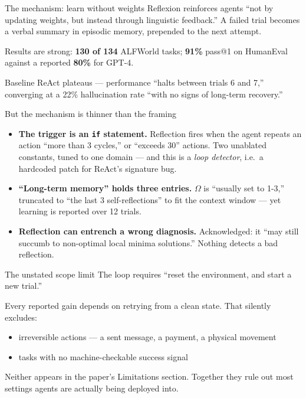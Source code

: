\documentclass[aspectratio=169]{beamer}
\begin{document}
\begin{frame}{The mechanism: learn without weights}
  Reflexion \citep{shinn2023reflexionlanguageagentsverbal} reinforces agents
  ``not by updating weights, but instead through linguistic feedback.'' A failed
  trial becomes a verbal summary in episodic memory, prepended to the next
  attempt.

  \vspace{1em}
  Results are strong: \textbf{130 of 134} ALFWorld tasks; \textbf{91\%} pass@1 on
  HumanEval against a reported \textbf{80\%} for GPT-4.

  \vspace{1em}
  Baseline ReAct plateaus --- performance ``halts between trials 6 and 7,''
  converging at a 22\% hallucination rate ``with no signs of long-term
  recovery.''
\end{frame}

\begin{frame}{But the mechanism is thinner than the framing}
  \begin{itemize}
    \item \textbf{The trigger is an \texttt{if} statement.} Reflection fires when
      the agent repeats an action ``more than 3 cycles,'' or ``exceeds 30''
      actions. Two unablated constants, tuned to one domain --- and this is a
      \emph{loop detector}, i.e.\ a hardcoded patch for ReAct's signature bug.
    \item \textbf{``Long-term memory'' holds three entries.} $\Omega$ is
      ``usually set to 1-3,'' truncated to ``the last 3 self-reflections'' to fit
      the context window --- yet learning is reported over 12 trials.
    \item \textbf{Reflection can entrench a wrong diagnosis.} Acknowledged: it
      ``may still succumb to non-optimal local minima solutions.'' Nothing
      detects a bad reflection.
  \end{itemize}
\end{frame}

\begin{frame}{The unstated scope limit}
  The loop requires ``reset the environment, and start a new trial.''

  \vspace{1em}
  Every reported gain depends on retrying from a clean state. That silently
  excludes:
  \begin{itemize}
    \item irreversible actions --- a sent message, a payment, a physical movement
    \item tasks with no machine-checkable success signal
  \end{itemize}

  \vspace{1em}
  Neither appears in the paper's Limitations section. Together they rule out most
  settings agents are actually being deployed into.
\end{frame}
\end{document}
